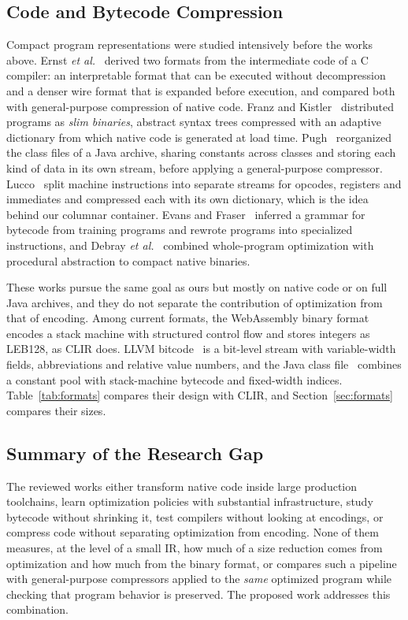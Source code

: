 \documentclass{ieeeaccess}
\newcommand{\clir}{CLIR}
\begin{document}
\subsection{Code and Bytecode Compression}
\label{sec:codecompression}
Compact program representations were studied intensively before the works above. Ernst \textit{et al.}~\cite{ernst1997code} derived two formats from the intermediate code of a C compiler: an interpretable format that can be executed without decompression and a denser wire format that is expanded before execution, and compared both with general-purpose compression of native code. Franz and Kistler~\cite{franz1997slim} distributed programs as \emph{slim binaries}, abstract syntax trees compressed with an adaptive dictionary from which native code is generated at load time. Pugh~\cite{pugh1999java} reorganized the class files of a Java archive, sharing constants across classes and storing each kind of data in its own stream, before applying a general-purpose compressor. Lucco~\cite{lucco2000split} split machine instructions into separate streams for opcodes, registers and immediates and compressed each with its own dictionary, which is the idea behind our columnar container. Evans and Fraser~\cite{evans2001grammar} inferred a grammar for bytecode from training programs and rewrote programs into specialized instructions, and Debray \textit{et al.}~\cite{debray2000compaction} combined whole-program optimization with procedural abstraction to compact native binaries.

These works pursue the same goal as ours but mostly on native code or on full Java archives, and they do not separate the contribution of optimization from that of encoding. Among current formats, the WebAssembly binary format~\cite{w3c2019wasm,haas2017wasm} encodes a stack machine with structured control flow and stores integers as LEB128, as \clir{} does. LLVM bitcode~\cite{llvm2024bitcode} is a bit-level stream with variable-width fields, abbreviations and relative value numbers, and the Java class file~\cite{lindholm2023jvm} combines a constant pool with stack-machine bytecode and fixed-width indices. Table~\ref{tab:formats} compares their design with \clir{}, and Section~\ref{sec:formats} compares their sizes.

\subsection{Summary of the Research Gap}
The reviewed works either transform native code inside large production toolchains, learn optimization policies with substantial infrastructure, study bytecode without shrinking it, test compilers without looking at encodings, or compress code without separating optimization from encoding. None of them measures, at the level of a small IR, how much of a size reduction comes from optimization and how much from the binary format, or compares such a pipeline with general-purpose compressors applied to the \emph{same} optimized program while checking that program behavior is preserved. The proposed work addresses this combination.
\end{document}
